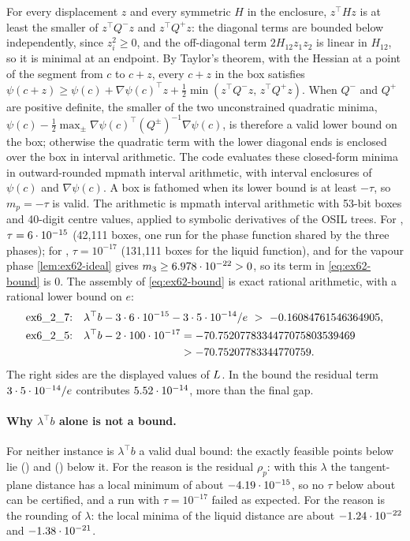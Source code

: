 For every displacement $z$ and every symmetric $H$ in the enclosure, $z^\top Hz$ is at least the smaller of $z^\top Q^-z$ and $z^\top Q^+z$: the diagonal terms are bounded below independently, since $z_i^2\ge0$, and the off-diagonal term $2H_{12}z_1z_2$ is linear in $H_{12}$, so it is minimal at an endpoint.
By Taylor's theorem, with the Hessian at a point of the segment from $c$ to $c+z$, every $c+z$ in the box satisfies $\psi(c+z)\ge\psi(c)+\nabla\psi(c)^\top z+\tfrac12\min(z^\top Q^-z,\,z^\top Q^+z)$.
When $Q^-$ and $Q^+$ are positive definite, the smaller of the two unconstrained quadratic minima, $\psi(c)-\tfrac12\max_\pm\nabla\psi(c)^\top(Q^\pm)^{-1}\nabla\psi(c)$, is therefore a valid lower bound on the box; otherwise the quadratic term with the lower diagonal ends is enclosed over the box in interval arithmetic.
The code evaluates these closed-form minima in outward-rounded mpmath interval arithmetic, with interval enclosures of $\psi(c)$ and $\nabla\psi(c)$.
A box is fathomed when its lower bound is at least $-\tau$, so $m_p=-\tau$ is valid.
The arithmetic is mpmath interval arithmetic with 53-bit boxes and 40-digit centre values, applied to symbolic derivatives of the OSIL trees.
For , $\tau=6\cdot 10^{-15}$ (42{,}111 boxes, one run for the phase function shared by the three phases);
for , $\tau=10^{-17}$ (131{,}111 boxes for the liquid function), and for the vapour phase \cref{lem:ex62-ideal} gives $m_3\ge6.978\cdot 10^{-22}>0$, so its term in \eqref{eq:ex62-bound} is $0$.
The assembly of \eqref{eq:ex62-bound} is exact rational arithmetic, with a rational lower bound on $e$:
\begin{align*}
\text{\inst{ex6_2_7}:}\quad & \lambda^\top b-3\cdot\sci{6}{-15}-3\cdot\sci{5}{-14}/e\ >\ -0.16084761546364905,\\
\text{\inst{ex6_2_5}:}\quad & \lambda^\top b-2\cdot100\cdot10^{-17}=-70.7520778334477075803539469\\
&\hphantom{\lambda^\top b-2\cdot100\cdot10^{-17}}>-70.75207783344770759.
\end{align*}
The right sides are the displayed values of $L$.
In the  bound the residual term $3\cdot5\cdot 10^{-14}/e$ contributes $5.52\cdot 10^{-14}$, more than the final gap.

\paragraph{Why $\lambda^\top b$ alone is not a bound.}
For neither instance is $\lambda^\top b$ a valid dual bound: the exactly feasible points below lie  () and  () below it.
For  the reason is the residual $\rho_p$:
with this $\lambda$ the tangent-plane distance has a local minimum of about $-4.19\cdot 10^{-15}$, so no $\tau$ below about  can be certified, and a run with $\tau=10^{-17}$ failed as expected.
For  the reason is the rounding of $\lambda$: the local minima of the liquid distance are about $-1.24\cdot 10^{-22}$ and $-1.38\cdot 10^{-21}$.

